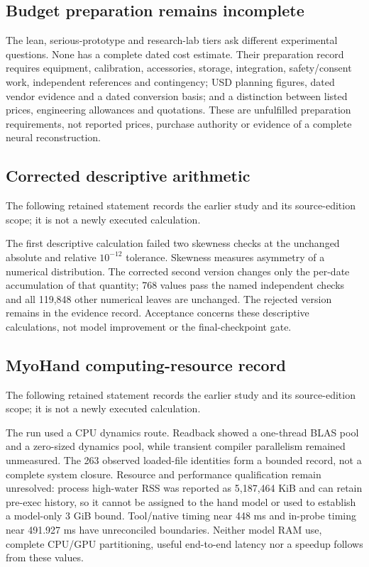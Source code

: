 \subsection{Budget preparation remains incomplete}
The lean, serious-prototype and research-lab tiers ask different experimental questions. None has a complete dated cost estimate. Their preparation record requires equipment, calibration, accessories, storage, integration, safety/consent work, independent references and contingency; USD planning figures, dated vendor evidence and a dated conversion basis; and a distinction between listed prices, engineering allowances and quotations. These are unfulfilled preparation requirements, not reported prices, purchase authority or evidence of a complete neural reconstruction.

\subsection{Corrected descriptive arithmetic}
The following retained statement records the earlier study and its source-edition scope; it is not a newly executed calculation.

The first descriptive calculation failed two skewness checks at the unchanged
absolute and relative $10^{-12}$ tolerance. Skewness measures asymmetry of a
numerical distribution. The corrected second version changes only the
per-date accumulation of that quantity; 768 values pass the named independent
checks and all 119,848 other numerical leaves are unchanged. The rejected
version remains in the evidence record. Acceptance concerns these descriptive
calculations, not model improvement or the final-checkpoint gate.

\subsection{MyoHand computing-resource record}
The following retained statement records the earlier study and its source-edition scope; it is not a newly executed calculation.

The run used a CPU dynamics route. Readback showed a one-thread BLAS pool and a zero-sized dynamics pool, while transient compiler parallelism remained unmeasured. The 263 observed loaded-file identities form a bounded record, not a complete system closure. Resource and performance qualification remain unresolved: process high-water RSS was reported as 5,187,464 KiB and can retain pre-exec history, so it cannot be assigned to the hand model or used to establish a model-only 3 GiB bound. Tool/native timing near 448 ms and in-probe timing near 491.927 ms have unreconciled boundaries. Neither model RAM use, complete CPU/GPU partitioning, useful end-to-end latency nor a speedup follows from these values.

